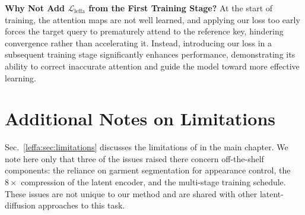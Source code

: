 \noindent \textbf{Why Not Add $\mathcal{L}_{\text{leffa}}$ from the First Training Stage?}
At the start of training, the attention maps are not well learned, and applying our \leffa{} loss too early forces the target query to prematurely attend to the reference key, hindering convergence rather than accelerating it.
Instead, introducing our \leffa{} loss in a subsequent training stage significantly enhances performance, demonstrating its ability to correct inaccurate attention and guide the model toward more effective learning.


\section{Additional Notes on Limitations}
Sec.~\ref{leffa:sec:limitations} discusses the limitations of \leffa{} in the main chapter. We note here only that three of the issues raised there concern off-the-shelf components: the reliance on garment segmentation for appearance control, the $8\times$ compression of the latent encoder, and the multi-stage training schedule. These issues are not unique to our method and are shared with other latent-diffusion approaches to this task.






